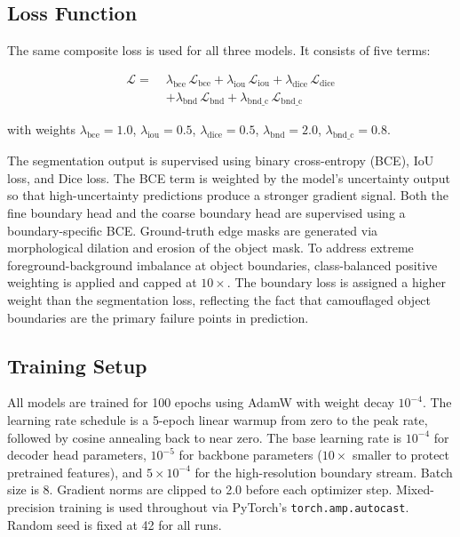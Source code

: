 \documentclass[10pt,conference]{IEEEtran}
\begin{document}
\subsection{Loss Function}

The same composite loss is used for all three models. It consists of five terms:

\begin{equation}
\begin{aligned}
\mathcal{L} =\;& \lambda_{\text{bce}}\,\mathcal{L}_{\text{bce}} 
+ \lambda_{\text{iou}}\,\mathcal{L}_{\text{iou}} 
+ \lambda_{\text{dice}}\,\mathcal{L}_{\text{dice}} \\
&+ \lambda_{\text{bnd}}\,\mathcal{L}_{\text{bnd}} 
+ \lambda_{\text{bnd\_c}}\,\mathcal{L}_{\text{bnd\_c}}
\end{aligned}
\end{equation}

with weights $\lambda_{\text{bce}} = 1.0$, $\lambda_{\text{iou}} = 0.5$, $\lambda_{\text{dice}} = 0.5$, $\lambda_{\text{bnd}} = 2.0$, $\lambda_{\text{bnd\_c}} = 0.8$.

The segmentation output is supervised using binary cross-entropy (BCE), IoU loss, and Dice loss. The BCE term is weighted by the model's uncertainty output so that high-uncertainty predictions produce a stronger gradient signal. Both the fine boundary head and the coarse boundary head are supervised using a boundary-specific BCE. Ground-truth edge masks are generated via morphological dilation and erosion of the object mask. To address extreme foreground-background imbalance at object boundaries, class-balanced positive weighting is applied and capped at $10{\times}$. The boundary loss is assigned a higher weight than the segmentation loss, reflecting the fact that camouflaged object boundaries are the primary failure points in prediction.

\subsection{Training Setup}
All models are trained for 100 epochs using AdamW with weight decay $10^{-4}$. The learning rate schedule is a 5-epoch linear warmup from zero to the peak rate, followed by cosine annealing back to near zero. The base learning rate is $10^{-4}$ for decoder head parameters, $10^{-5}$ for backbone parameters ($10{\times}$ smaller to protect pretrained features), and $5{\times}10^{-4}$ for the high-resolution boundary stream. Batch size is 8. Gradient norms are clipped to 2.0 before each optimizer step. Mixed-precision training is used throughout via PyTorch's \texttt{torch.amp.autocast}. Random seed is fixed at 42 for all runs.
\end{document}
